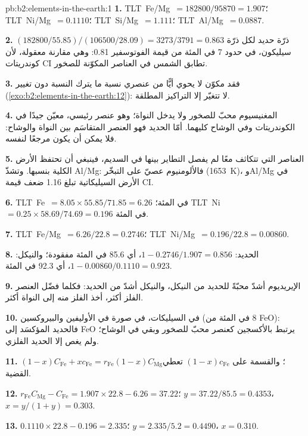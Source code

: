 \begin{solution}{pb:b2:elements-in-the-earth:1}
\textbf{1.} \mbox{\textdir TLT Fe/Mg $= \num{182800}/\num{95870} = 1.907$}؛ \mbox{\textdir TLT Ni/Mg $= 0.1110$}؛ \mbox{\textdir TLT Si/Mg $=
1.111$}؛ \mbox{\textdir TLT Al/Mg $= 0.0887$}.

\textbf{2.} $(\num{182800}/55.85)/(\num{106500}/28.09) = 3273/3791 = 0.863$ ذرّة حديد لكل
ذرّة سيليكون، في حدود 7 في المئة من قيمة الفوتوسفير 0.81: وهي مقارنة معقولة، لأن كوندريتات CI
تطابق الشمس في العناصر المكوّنة للصخور.

\textbf{3.} فقد مكوّن لا يحوي أيًّا من عنصري نسبة ما يترك
النسبة دون تغيير (\cref{exo:b2:elements-in-the-earth:12}): لا تتغيّر إلا التراكيز المطلقة.

\textbf{4.} المغنيسيوم محبّ للصخور ولا يدخل النواة؛ وهو عنصر رئيسي،
معيّن جيدًا في الكوندريتات وفي الوشاح كليهما. أمّا الحديد فهو العنصر المتقاسَم
بين النواة والوشاح: فلا يمكن أن يكون مرجعًا لنفسه.

\textbf{5.} العناصر التي تتكاثف معًا لم يفصل التطاير بينها في
السديم، فينبغي أن تحتفظ الأرض الكلية بنسبها. وتشذّ Al/Mg: فالألومنيوم
عصيّ على التبخّر (\qty{1653}{K})، وAl/Mg في الأرض السيليكاتية تبلغ 1.16 ضعف قيمة CI.

\textbf{6.} \mbox{\textdir TLT Fe $= 8.05\times55.85/71.85 = 6.26$} في المئة؛ \mbox{\textdir TLT Ni $= 0.25\times58.69/74.69 =
0.196$} في المئة.

\textbf{7.} \mbox{\textdir TLT Fe/Mg $= 6.26/22.8 = 0.2746$}؛ \mbox{\textdir TLT Ni/Mg $= 0.196/22.8 = 0.00860$}.

\textbf{8.} الحديد: $1 - 0.2746/1.907 = 0.856$، أي 85.6 في المئة مفقودة؛ والنيكل:
$1 - 0.00860/0.1110 = 0.923$، أي 92.3 في المئة.

\textbf{9.} الإيريديوم أشدّ محبّةً للحديد من النيكل، والنيكل أشدّ من الحديد:
فكلما فضّل العنصر الفلز أكثر، أخذ الفلز منه إلى النواة أكثر.

\textbf{10.} في السيليكات، في صورة  في الأوليفين والبيروكسين (8 في المئة من FeO):
فالحديد المؤكسَد إلى FeO يرتبط بالأكسجين كعنصر محبّ للصخور وبقي في
الوشاح؛ ولم يغص إلا الحديد الفلزي.

\textbf{11.} $(1-x)C_{\mathrm{Fe}} + xc_{\mathrm{Fe}} = r_{\mathrm{Fe}}(1-x)C_{\mathrm{Mg}}$؛
والقسمة على $(1-x)c_{\mathrm{Fe}}$ تعطي القضية.

\textbf{12.} $r_{\mathrm{Fe}}C_{\mathrm{Mg}} - C_{\mathrm{Fe}} = 1.907\times22.8 - 6.26 =
37.22$؛ $y = 37.22/85.5 = 0.4353$، $x = y/(1+y) = 0.303$.

\textbf{13.} $0.1110\times22.8 - 0.196 = 2.335$؛ $y = 2.335/5.2 = 0.4490$، $x = 0.310$.


\end{solution}

